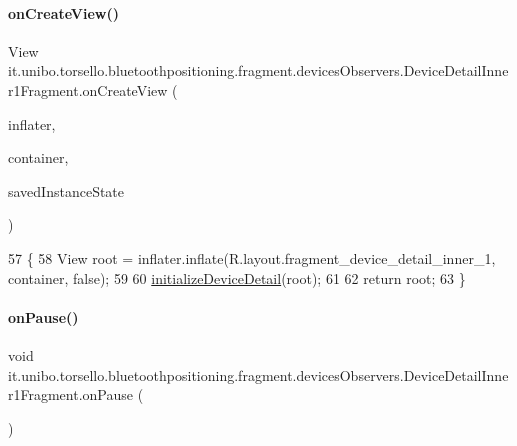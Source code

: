 \paragraph{\texorpdfstring{on\+Create\+View()}{onCreateView()}}
{\footnotesize\ttfamily View it.\+unibo.\+torsello.\+bluetoothpositioning.\+fragment.\+devices\+Observers.\+Device\+Detail\+Inner1\+Fragment.\+on\+Create\+View (\begin{DoxyParamCaption}\item[{Layout\+Inflater}]{inflater,  }\item[{View\+Group}]{container,  }\item[{Bundle}]{saved\+Instance\+State }\end{DoxyParamCaption})}


\begin{DoxyCode}
57                                                                                                       \{
58         View root = inflater.inflate(R.layout.fragment\_device\_detail\_inner\_1, container, \textcolor{keyword}{false});
59 
60         \hyperlink{classit_1_1unibo_1_1torsello_1_1bluetoothpositioning_1_1fragment_1_1devicesObservers_1_1DeviceDetailInner1Fragment_a60ac3d2537a790a04e49c72c3651ff25_a60ac3d2537a790a04e49c72c3651ff25}{initializeDeviceDetail}(root);
61 
62         \textcolor{keywordflow}{return} root;
63     \}
\end{DoxyCode}
\hypertarget{classit_1_1unibo_1_1torsello_1_1bluetoothpositioning_1_1fragment_1_1devicesObservers_1_1DeviceDetailInner1Fragment_a9629cf5558354f0b8041e5292b93c22a_a9629cf5558354f0b8041e5292b93c22a}{}\label{classit_1_1unibo_1_1torsello_1_1bluetoothpositioning_1_1fragment_1_1devicesObservers_1_1DeviceDetailInner1Fragment_a9629cf5558354f0b8041e5292b93c22a_a9629cf5558354f0b8041e5292b93c22a} 
\paragraph{\texorpdfstring{on\+Pause()}{onPause()}}
{\footnotesize\ttfamily void it.\+unibo.\+torsello.\+bluetoothpositioning.\+fragment.\+devices\+Observers.\+Device\+Detail\+Inner1\+Fragment.\+on\+Pause (\begin{DoxyParamCaption}{ }\end{DoxyParamCaption})}


